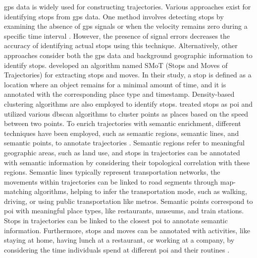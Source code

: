 \documentclass{article}
\theoremstyle{definition}
\theoremstyle{remark}
\begin{document}
\acrfull{gps} data is widely used for constructing trajectories. Various approaches exist for identifying stops from \acrshort{gps} data. One method involves detecting stops by examining the absence of \acrshort{gps} signals or when the velocity remains zero during a specific time interval \citep{ashbrook_using_2003}. However, the presence of signal errors decreases the accuracy of identifying actual stops using this technique. Alternatively, other approaches consider both the \acrshort{gps} data and background geographic information to identify stops. \cite{alvares_model_2007} developed an algorithm named SMoT (Stops and Moves of Trajectories) for extracting stops and moves. In their study, a stop is defined as a location where an object remains for a minimal amount of time, and it is annotated with the corresponding place type and timestamp. Density-based clustering algorithms are also employed to identify stops. \cite{palma_clustering-based_2008} treated stops as \acrshort{poi} and utilized various \acrshort{dbscan} algorithms to cluster points as places based on the speed between two points. To enrich trajectories with semantic enrichment, different techniques have been employed, such as semantic regions, semantic lines, and semantic points, to annotate trajectories \citep{yan_semantic_2013}. Semantic regions refer to meaningful geographic areas, such as land use, and stops in trajectories can be annotated with semantic information by considering their topological correlation with these regions. Semantic lines typically represent transportation networks, the movements within trajectories can be linked to road segments through map-matching algorithms, helping to infer the transportation mode, such as walking, driving, or using public transportation like metros. Semantic points correspond to \acrshort{poi} with meaningful place types, like restaurants, museums, and train stations. Stops in trajectories can be linked to the closest \acrshort{poi} to annotate semantic information. Furthermore, stops and moves can be annotated with activities, like staying at home, having lunch at a restaurant, or working at a company, by considering the time individuals spend at different \acrshort{poi} and their routines \cite{parent_semantic_2013}.
\end{document}
